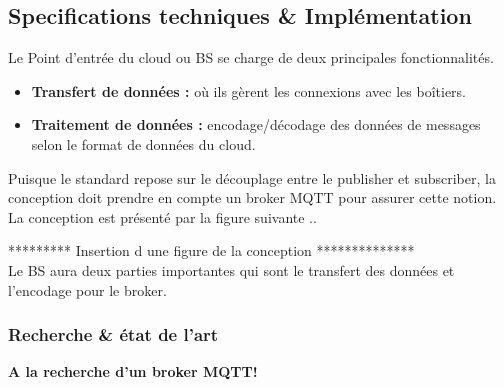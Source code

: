        

    \subsection{Specifications techniques \& Implémentation}
       
        Le Point d’entrée du cloud ou BS se charge de deux principales fonctionnalités. 
        \begin{itemize}
            \renewcommand{\labelitemi}{$\bullet$}
            \item  \textbf{Transfert de données :} où ils gèrent les connexions avec les boîtiers.
            \item  \textbf{Traitement de données :} encodage/décodage des données de messages selon le format de données du cloud.
        \end{itemize}

        Puisque le standard repose sur le découplage entre le publisher et subscriber, la conception doit prendre 
        en compte  un broker MQTT pour assurer cette notion. 
        La conception est présenté par la figure suivante .. 

 ********* Insertion d une figure de la conception ************** \\
        Le BS aura deux parties importantes qui sont le transfert des données et l'encodage pour le broker.

        \subsubsection{Recherche \& état de l'art}
            
        \textbf{A la recherche d'un broker MQTT! }


